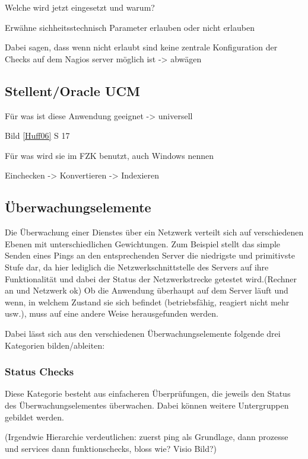Welche wird jetzt eingesetzt und warum?

Erwähne sichheitsstechnisch Parameter erlauben oder nicht erlauben

Dabei sagen, dass wenn nicht erlaubt sind keine zentrale Konfiguration der Checks auf dem Nagios server möglich ist -> abwägen

\subsection{Stellent/Oracle UCM}
Für was ist diese Anwendung geeignet -> universell

\begin{center}
Bild \ref{Huff06} S 17
\end{center}

Für was wird sie im FZK benutzt, auch Windows nennen

Einchecken -> Konvertieren -> Indexieren
\subsection{Überwachungselemente}
Die Überwachung einer Dienstes über ein Netzwerk verteilt sich auf verschiedenen Ebenen mit unterschiedlichen Gewichtungen.
Zum Beispiel stellt das simple Senden eines Pings an den entsprechenden Server die niedrigste und primitivste Stufe dar, da hier lediglich die Netzwerkschnittstelle des Servers auf ihre Funktionalität und dabei der Status der Netzwerkstrecke getestet wird.(Rechner an und Netzwerk ok)
Ob die Anwendung überhaupt auf dem Server läuft und wenn, in welchem Zustand sie sich befindet (betriebsfähig, reagiert nicht mehr usw.), muss auf eine andere Weise herausgefunden werden.

Dabei lässt sich aus den verschiedenen Überwachungselemente folgende drei Kategorien bilden/ableiten:

\subsubsection{Status Checks}
Diese Kategorie besteht aus einfacheren Überprüfungen, die jeweils den Status des Überwachungselementes überwachen.
Dabei können weitere Untergruppen gebildet werden.

(Irgendwie Hierarchie verdeutlichen: zuerst ping als Grundlage, dann prozesse und services dann funktionschecks, bloss wie? Visio Bild?)

